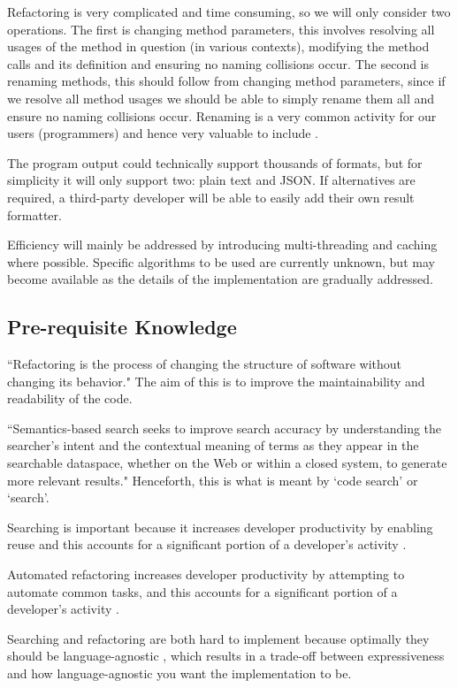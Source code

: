 \documentclass[12pt, letterpaper]{article}
\begin{document}
Refactoring is very complicated and time consuming, so we will only consider two operations.
The first is changing method parameters, this involves resolving all usages of the method in question (in various contexts), modifying the method calls and its definition and ensuring no naming collisions occur.
The second is renaming methods, this should follow from changing method parameters, since if we resolve all method usages we should be able to simply rename them all and ensure no naming collisions occur.
Renaming is a very common activity for our users (programmers) and hence very valuable to include \autocite{murphy2012we}.

The program output could technically support thousands of formats, but for simplicity it will only support two: plain text and JSON.
If alternatives are required, a third-party developer will be able to easily add their own result formatter.

Efficiency will mainly be addressed by introducing multi-threading and caching where possible.
Specific algorithms to be used are currently unknown, but may become available as the details of the implementation are gradually addressed.

\subsection{Pre-requisite Knowledge}
``Refactoring is the process of changing the structure of software without changing its behavior." \autocite{murphy2012we} The aim of this is to improve the maintainability and readability of the code.

``Semantics-based search seeks to improve search accuracy by understanding the searcher's intent and the contextual meaning of terms as they appear in the searchable dataspace, whether on the Web or within a closed system, to generate more relevant results." \autocite{wikipediasemanticsearch} Henceforth, this is what is meant by `code search' or `search'.

Searching is important because it increases developer productivity by enabling reuse and this accounts for a significant portion of a developer's activity \autocite{reiss2009semantics,stolee2014solving}.

Automated refactoring increases developer productivity by attempting to automate common tasks, and this accounts for a significant portion of a developer's activity \autocite{mens2004survey,murphy2012we}.

Searching and refactoring are both hard to implement because optimally they should be language-agnostic \autocite{mens2004survey,reiss2009semantics}, which results in a trade-off between expressiveness and how language-agnostic you want the implementation to be.
\end{document}

